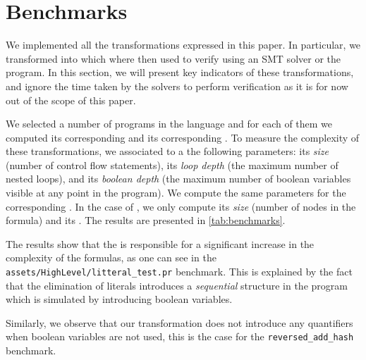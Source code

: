 \section{Benchmarks}
\label{sec:benchmarks}

We implemented all the transformations expressed in this paper. In particular,
we transformed  into  which where then used to verify 
using an SMT solver or the  program. In this section, we will present
key indicators of these transformations, and ignore the time taken by the
solvers to perform verification as it is for now out of the scope of this
paper.

We selected a number of programs in the  language
and for each of them we computed its corresponding  and
its corresponding . To measure the complexity of
these transformations, we associated to a  the
following parameters: its \emph{size} (number of control flow statements), its
\emph{loop depth} (the maximum number of nested loops), and its \emph{boolean
depth} (the maximum number of boolean variables visible at any point in the
program). We compute the same parameters for the corresponding . In the case of , we only compute
its \emph{size} (number of nodes in the formula) and its .
The results are presented in \cref{tab:benchmarks}.

The results show that the  is responsible for a
significant increase in the complexity of the formulas, as one can see in the
\texttt{assets/HighLevel/litteral\_test.pr} benchmark. This is explained by the
fact that the elimination of literals introduces a \emph{sequential} structure
in the program which is simulated by introducing boolean variables.

Similarly, we observe that our transformation does not introduce any
quantifiers when boolean variables are not used, this is the case for the
\texttt{reversed\_add\_hash} benchmark. 





